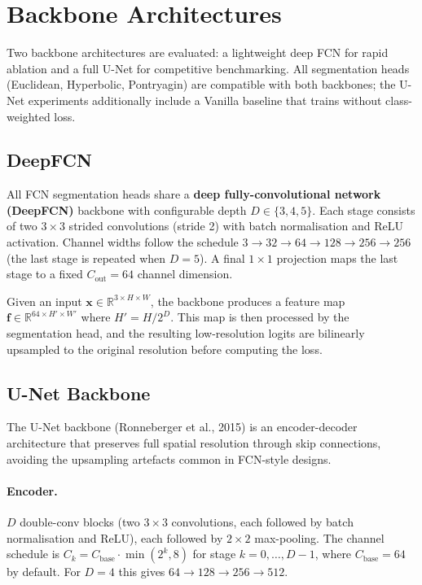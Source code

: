\documentclass[12pt,a4paper]{article}
\newcommand{\R}{\mathbb{R}}
\theoremstyle{definition}
\begin{document}
\section{Backbone Architectures}

Two backbone architectures are evaluated: a lightweight deep FCN for rapid
ablation and a full U-Net for competitive benchmarking.  All segmentation
heads (Euclidean, Hyperbolic, Pontryagin) are compatible with both backbones;
the U-Net experiments additionally include a Vanilla baseline that trains
without class-weighted loss.

\subsection{DeepFCN}
\label{sec:deepfcn}

All FCN segmentation heads share a \textbf{deep fully-convolutional network
(DeepFCN)} backbone with configurable depth $D \in \{3,4,5\}$.  Each stage
consists of two $3\times3$ strided convolutions (stride 2) with batch
normalisation and ReLU activation.  Channel widths follow the schedule
$3 \to 32 \to 64 \to 128 \to 256 \to 256$ (the last stage is repeated when
$D = 5$).  A final $1 \times 1$ projection maps the last stage to a fixed
$C_{\text{out}} = 64$ channel dimension.

Given an input $\mathbf{x} \in \R^{3 \times H \times W}$, the backbone
produces a feature map $\mathbf{f} \in \R^{64 \times H' \times W'}$ where
$H' = H / 2^D$.  This map is then processed by the segmentation head, and
the resulting low-resolution logits are bilinearly upsampled to the original
resolution before computing the loss.

\subsection{U-Net Backbone}
\label{sec:unet}

The U-Net backbone (Ronneberger et al., 2015) is an encoder-decoder
architecture that preserves full spatial resolution through skip connections,
avoiding the upsampling artefacts common in FCN-style designs.

\paragraph{Encoder.}
$D$ double-conv blocks (two $3\times3$ convolutions, each followed by batch
normalisation and ReLU), each followed by $2\times2$ max-pooling.  The
channel schedule is $C_k = C_{\text{base}} \cdot \min(2^k, 8)$ for stage
$k = 0,\ldots,D-1$, where $C_{\text{base}} = 64$ by default.  For $D = 4$
this gives $64 \to 128 \to 256 \to 512$.
\end{document}
